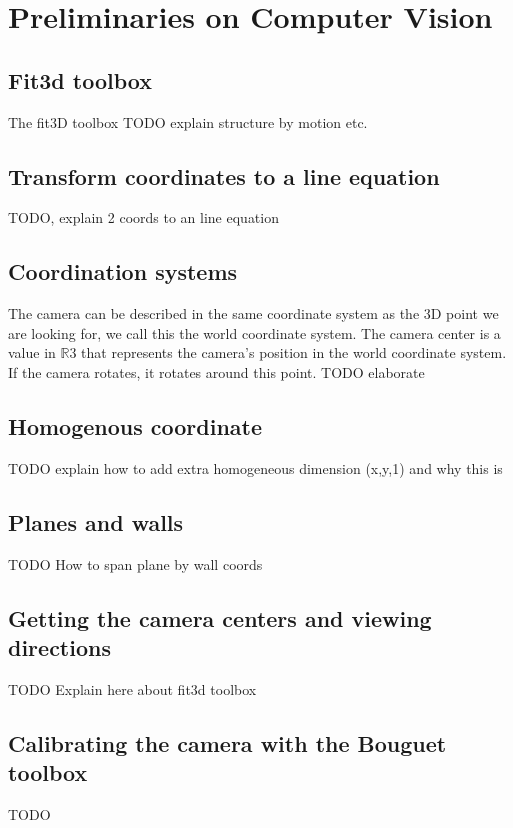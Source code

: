 \section{Preliminaries on Computer Vision}
\subsection{Fit3d toolbox}
The fit3D toolbox \cite{Fit3d} 
TODO explain structure by motion etc.

\subsection{Transform coordinates to a line equation}
\label{sec:lineeq}
TODO, explain 2 coords to an line equation


\subsection{Coordination systems}
The camera can be described in the same coordinate system as the 3D point we are
looking for, we call this the world coordinate system. 
The camera center is a value in $\mathbb{R}$3 that represents the camera's position in the world
coordinate system. If the camera rotates, it rotates around this point.
TODO elaborate\\

\subsection{Homogenous coordinate}
TODO explain how to add extra homogeneous dimension (x,y,1) and why this is


\subsection{Planes and walls}
\label{sec:planeswalls}
TODO How to span plane by wall coords

\subsection{Getting the camera centers and viewing directions}
\label{sec:cameracenters}
TODO Explain here about fit3d toolbox

\subsection{Calibrating the camera with the Bouguet toolbox}
\label{sec:bouguet}
TODO


